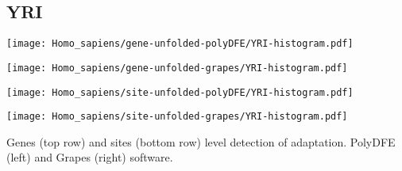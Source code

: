 \documentclass{article}
\begin{document}
\subsection{YRI}
\centering
\begin{minipage}{0.49\linewidth}
    \texttt{[image: Homo\_sapiens/gene-unfolded-polyDFE/YRI-histogram.pdf]}
\end{minipage}%
\hfill
\begin{minipage}{0.49\linewidth}
    \texttt{[image: Homo\_sapiens/gene-unfolded-grapes/YRI-histogram.pdf]}
\end{minipage}
\begin{minipage}{0.49\linewidth}
    \texttt{[image: Homo\_sapiens/site-unfolded-polyDFE/YRI-histogram.pdf]}
\end{minipage}%
\hfill
\begin{minipage}{0.49\linewidth}
    \texttt{[image: Homo\_sapiens/site-unfolded-grapes/YRI-histogram.pdf]}
\end{minipage}
\flushleft
Genes (top row) and sites (bottom row) level detection of adaptation.
PolyDFE (left) and Grapes (right) software.
\end{document}
